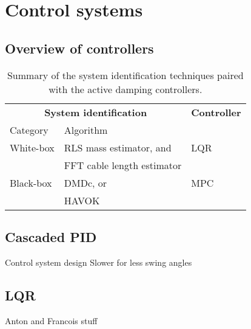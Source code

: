 
{

\chapter{Control systems}
\label{chap:control}

    \FloatBarrier\section{Overview of controllers} \label{sec:controller_overview}

        \begin{table}[!h]
            \renewcommand{\arraystretch}{1.1}
            \centering
            \caption{Summary of the system identification techniques paired with the active damping controllers.}
            \begin{tabularx}{0.75\linewidth}{@{}lll@{}}
                \toprule
                \multicolumn{2}{c}{\textbf{System identification}}   & \textbf{Controller} \\
                \cmidrule(lr){1-2}
                Category    & Algorithm                     & \\
                \midrule
                White-box   & RLS mass estimator, and       & \gls{LQR} \\
                            & FFT cable length estimator    & \\
                Black-box   & DMDc, or                      & \gls{MPC} \\
                            & HAVOK                         & \\
                \bottomrule
            \end{tabularx}
            \label{tbl:controller_summary}
        \end{table}
    

    \FloatBarrier\section{Cascaded PID}

        Control system design
        Slower for less swing angles

    \FloatBarrier\section{LQR} \label{sec:lqr}

        Anton and Francois stuff

}
